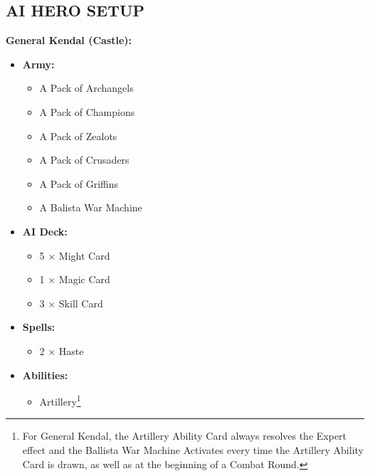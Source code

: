 \begin{multicols*}{2}
\subsection*{\MakeUppercase{AI Hero Setup}}

\textbf{General Kendal (Castle):}
\begin{itemize}
    \item \textbf{Army:}
    \begin{itemize}
        \item A Pack of Archangels
        \item A Pack of Champions
        \item A Pack of Zealots
        \item A Pack of Crusaders
        \item A Pack of Griffins
        \item A Balista War Machine
    \end{itemize}
    \item \textbf{AI Deck:}
    \begin{itemize}
        \item 5 × Might  Card
        \item 1 × Magic  Card
        \item 3 × Skill  Card
    \end{itemize}
    \item \textbf{Spells:}
    \begin{itemize}
        \item 2 × Haste
    \end{itemize}
    \item \textbf{Abilities:}
    \begin{itemize}
        \item Artillery\footnote{For General Kendal, the Artillery Ability Card always resolves the Expert effect and the Ballista War Machine Activates every time the Artillery Ability Card is drawn, as well as at the beginning of a Combat Round.}
    \end{itemize}
\end{itemize}


\end{multicols*}
